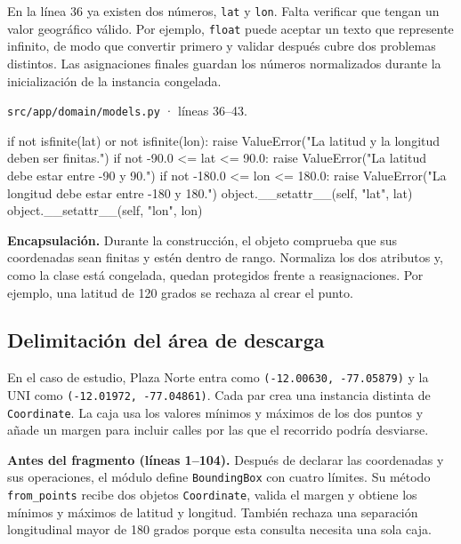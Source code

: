 \documentclass[11pt,a4paper]{article}
\begin{document}
En la línea 36 ya existen dos números, \texttt{lat} y \texttt{lon}. Falta verificar que tengan un valor geográfico válido. Por ejemplo, \texttt{float} puede aceptar un texto que represente infinito, de modo que convertir primero y validar después cubre dos problemas distintos. Las asignaciones finales guardan los números normalizados durante la inicialización de la instancia congelada.

\par\medskip
\noindent\begin{minipage}{\linewidth}
{\footnotesize\nolinkurl{src/app/domain/models.py} · líneas 36--43.\par}
\nopagebreak[4]
\begin{Codigo}[firstnumber=36]
        if not isfinite(lat) or not isfinite(lon):
            raise ValueError("La latitud y la longitud deben ser finitas.")
        if not -90.0 <= lat <= 90.0:
            raise ValueError("La latitud debe estar entre -90 y 90.")
        if not -180.0 <= lon <= 180.0:
            raise ValueError("La longitud debe estar entre -180 y 180.")
        object.__setattr__(self, "lat", lat)
        object.__setattr__(self, "lon", lon)
\end{Codigo}
\end{minipage}\par

\textbf{Encapsulación.} Durante la construcción, el objeto comprueba que sus coordenadas sean finitas y estén dentro de rango. Normaliza los dos atributos y, como la clase está congelada, quedan protegidos frente a reasignaciones. Por ejemplo, una latitud de 120 grados se rechaza al crear el punto.

\clearpage
\subsection{Delimitación del área de descarga}

En el caso de estudio, Plaza Norte entra como \texttt{(-12.00630, -77.05879)} y la UNI como \texttt{(-12.01972, -77.04861)}. Cada par crea una instancia distinta de \texttt{Coordinate}. La caja usa los valores mínimos y máximos de los dos puntos y añade un margen para incluir calles por las que el recorrido podría desviarse.

\textbf{Antes del fragmento (líneas 1--104).} Después de declarar las coordenadas y sus operaciones, el módulo define \texttt{BoundingBox} con cuatro límites. Su método \texttt{from\_points} recibe dos objetos \texttt{Coordinate}, valida el margen y obtiene los mínimos y máximos de latitud y longitud. También rechaza una separación longitudinal mayor de 180 grados porque esta consulta necesita una sola caja.
\end{document}
